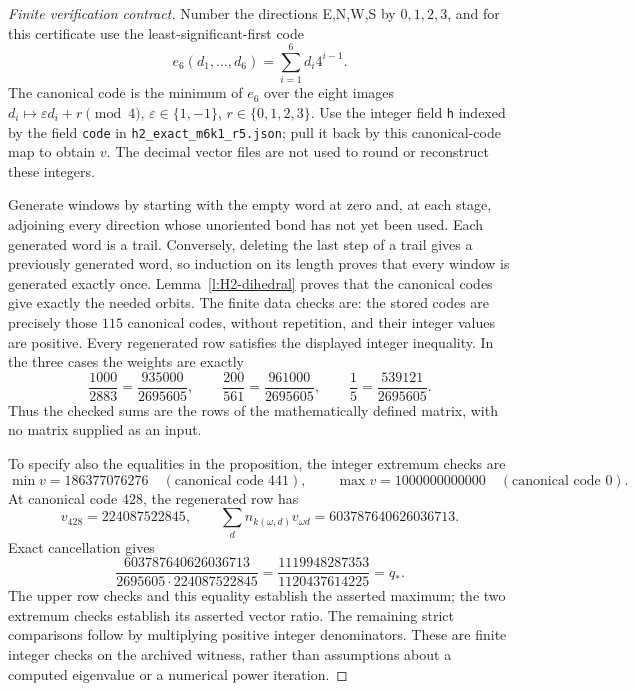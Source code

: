 \begin{proof}[Finite verification contract]
Number the directions E,N,W,S by \(0,1,2,3\), and for this
certificate use the least-significant-first code
\[
 e_6(d_1,\ldots,d_6)=\sum_{i=1}^6d_i4^{i-1}.
\]
The canonical code is the minimum of \(e_6\) over the eight images
\(d_i\mapsto \varepsilon d_i+r\pmod4\),
\(\varepsilon\in\{1,-1\}\), \(r\in\{0,1,2,3\}\).
Use the integer field \texttt{h} indexed by the field \texttt{code}
in \texttt{h2\_exact\_m6k1\_r5.json}; pull it back by this
canonical-code map to obtain \(v\). The decimal vector files are
not used to round or reconstruct these integers.

Generate windows by starting with the empty word at zero and,
at each stage, adjoining every direction whose unoriented bond has
not yet been used. Each generated word is a trail. Conversely,
deleting the last step of a trail gives a previously generated word,
so induction on its length proves that every window is generated
exactly once. Lemma~\ref{l:H2-dihedral} proves that the canonical
codes give exactly the needed orbits. The finite data checks are:
the stored codes are precisely those \(115\) canonical codes,
without repetition, and their integer values are positive.
Every regenerated row satisfies the displayed integer inequality.
In the three cases the weights are exactly
\[
 \frac{1000}{2883}=\frac{935000}{2695605},\qquad
 \frac{200}{561}=\frac{961000}{2695605},\qquad
 \frac15=\frac{539121}{2695605}.
\]
Thus the checked sums are the rows of the mathematically defined
matrix, with no matrix supplied as an input.

To specify also the equalities in the proposition, the integer
extremum checks are
\[
 \min v=186377076276\quad(\text{canonical code }441),\qquad
 \max v=1000000000000\quad(\text{canonical code }0).
\]
At canonical code \(428\), the regenerated row has
\[
 v_{428}=224087522845,\qquad
 \sum_d n_{k(\omega,d)}v_{\omega d}=603787640626036713.
\]
Exact cancellation gives
\[
 \frac{603787640626036713}{2695605\cdot224087522845}
 =\frac{1119948287353}{1120437614225}=q_*.
\]
The upper row checks and this equality establish the asserted
maximum; the two extremum checks establish its asserted vector
ratio. The remaining strict comparisons follow by multiplying
positive integer denominators. These are finite integer checks on
the archived witness, rather than assumptions about a computed
eigenvalue or a numerical power iteration.
\end{proof}

